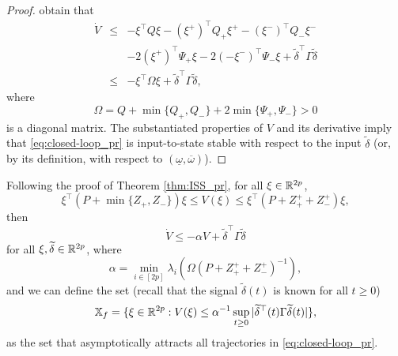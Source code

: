 \documentclass[letterpaper, 10 pt, conference]{ieeeconf}  %
\begin{document}
\begin{proof}
obtain that
\begin{eqnarray*}
\dot{V} & \leq & -\xi^{\top}Q\xi-(\xi^{+})^{\top}Q_{+}\xi^{+}-(\xi^{-})^{\top}Q_{-}\xi^{-}\\
 &  & -2(\xi^{+})^{\top}\Psi_{+}\xi-2(-\xi^{-})^{\top}\Psi_{-}\xi+\tilde{\delta}^{\top}\Gamma\tilde{\delta}\\
 & \leq & -\xi^{\top}\Omega\xi+\tilde{\delta}^{\top}\Gamma\tilde{\delta},
\end{eqnarray*}
where
\[
\Omega=Q+\min\{Q_{+},Q_{-}\}+2\min\{\Psi_{+},\Psi_{-}\}>0
\]
is a diagonal matrix. The substantiated properties of $V$ and its
derivative imply that \eqref{eq:closed-loop_pr} is input-to-state
stable \cite{Sontag:01:Springer,Dashkovskiy:11:AiT} with respect
to the input $\tilde{\delta}$ (or, by its definition, with respect
to $(\underline{\omega},\overline{\omega})$).
\end{proof}
Following the proof of Theorem \ref{thm:ISS_pr}, for all $\xi\in\mathbb{R}^{2p}$,
\[
\xi^{\top}(P+\min\{Z_{+},Z_{-}\})\xi\leq V(\xi)\leq\xi^{\top}(P+Z_{+}^{+}+Z_{-}^{+})\xi,
\]
then
\[
\dot{V}\leq-\alpha V+\tilde{\delta}^{\top}\Gamma\tilde{\delta}
\]
for all $\xi,\widetilde{\delta}\in\mathbb{R}^{2p}$, where
\[
\alpha=\min_{i\in[2p]}\lambda_{i}\left(\Omega(P+Z_{+}^{+}+Z_{-}^{+})^{-1}\right),
\]
and we can define the set (recall that the signal $\tilde{\delta}(t)$
is known for all $t\geq0$)
\begin{equation}
\mathbb{X}_{f}=\{\xi\in\mathbb{R}^{2p}:V(\xi)\leq\alpha^{-1}\sup_{t\geq0}|\widetilde{\delta}^{\top}(t)\Gamma\widetilde{\delta}(t)|\},\label{eq:X_f}
\end{equation}
as the set that asymptotically attracts all trajectories in \eqref{eq:closed-loop_pr}.
\end{document}
